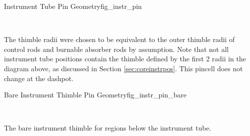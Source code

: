 \begin{geoitem}{Instrument Tube Pin Geometry}{fig_instr_pin}\centering

\\ \raggedright The thimble radii were chosen to be equivalent to the outer
thimble radii of control rods and burnable absorber rods by assumption. Note
that not all instrument tube positions contain the thimble defined by the first
2 radii in the diagram above, as discussed in Section \ref{sec:coreinstrpos}.
This pincell does not change at the dashpot.
\end{geoitem}

\begin{geoitem}{Bare Instrument Thimble Pin Geometry}{fig_instr_pin_bare}\centering

\\ \raggedright The bare instrument thimble for regions below the instrument tube.
\end{geoitem}
